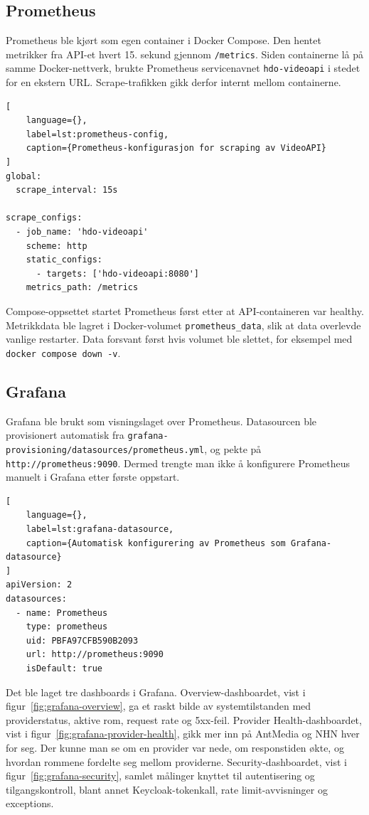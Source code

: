 \subsection{Prometheus}

Prometheus ble kjørt som egen container i Docker Compose. Den hentet metrikker fra API-et hvert 15. sekund gjennom \texttt{/metrics}. Siden containerne lå på samme Docker-nettverk, brukte Prometheus servicenavnet \texttt{hdo-videoapi} i stedet for en ekstern URL. Scrape-trafikken gikk derfor internt mellom containerne.

\begin{lstlisting}[
    language={},
    label=lst:prometheus-config,
    caption={Prometheus-konfigurasjon for scraping av VideoAPI}
]
global:
  scrape_interval: 15s

scrape_configs:
  - job_name: 'hdo-videoapi'
    scheme: http
    static_configs:
      - targets: ['hdo-videoapi:8080']
    metrics_path: /metrics
\end{lstlisting}

Compose-oppsettet startet Prometheus først etter at API-containeren var healthy. Metrikkdata ble lagret i Docker-volumet \texttt{prometheus\_data}, slik at data overlevde vanlige restarter. Data forsvant først hvis volumet ble slettet, for eksempel med \texttt{docker compose down -v}.

\subsection{Grafana}

Grafana ble brukt som visningslaget over Prometheus. Datasourcen ble provisionert automatisk fra \texttt{grafana-provisioning/datasources/prometheus.yml}, og pekte på \texttt{http://prometheus:9090}. Dermed trengte man ikke å konfigurere Prometheus manuelt i Grafana etter første oppstart.

\begin{lstlisting}[
    language={},
    label=lst:grafana-datasource,
    caption={Automatisk konfigurering av Prometheus som Grafana-datasource}
]
apiVersion: 2
datasources:
  - name: Prometheus
    type: prometheus
    uid: PBFA97CFB590B2093
    url: http://prometheus:9090
    isDefault: true
\end{lstlisting}

Det ble laget tre dashboards i Grafana. Overview-dashboardet, vist i figur~\ref{fig:grafana-overview}, ga et raskt bilde av systemtilstanden med providerstatus, aktive rom, request rate og 5xx-feil. Provider Health-dashboardet, vist i figur~\ref{fig:grafana-provider-health}, gikk mer inn på AntMedia og NHN hver for seg. Der kunne man se om en provider var nede, om responstiden økte, og hvordan rommene fordelte seg mellom providerne. Security-dashboardet, vist i figur~\ref{fig:grafana-security}, samlet målinger knyttet til autentisering og tilgangskontroll, blant annet Keycloak-tokenkall, rate limit-avvisninger og exceptions.


